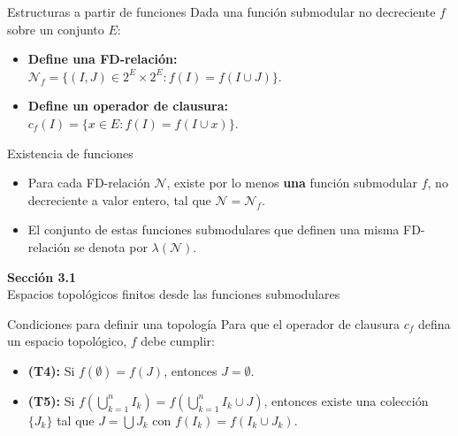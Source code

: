 \documentclass{beamer}
\begin{document}
  \begin{frame}{Estructuras a partir de funciones}
    Dada una función submodular no decreciente $f$ sobre un conjunto $E$:
    
    \vspace{0.5cm}
    \begin{itemize}[<+->]
      \item \textbf{Define una FD-relación:} \\
            $\mathcal{N}_{f}=\{(I,J)\in2^{E}\times2^{E}:f(I)=f(I\cup J)\}$.
            \vspace{0.3cm}
      \item \textbf{Define un operador de clausura:} \\
            $c_{f}(I)=\{x\in E:f(I)=f(I\cup x)\}$.
    \end{itemize}
  \end{frame}

  \begin{frame}{Existencia de funciones}
    \begin{itemize}[<+->]
      \item Para cada FD-relación $\mathcal{N}$, existe por lo menos \textbf{una} función submodular $f$, no decreciente a valor entero, tal que $\mathcal{N}=\mathcal{N}_{f}$.
      \item El conjunto de estas funciones submodulares que definen una misma FD-relación se denota por $\lambda(\mathcal{N})$.
    \end{itemize}
  \end{frame}

  \begin{frame}
    \begin{center}
      \Huge \textbf{Sección 3.1}\\
      \vspace{0.5cm}
      \Large Espacios topológicos finitos desde las funciones submodulares
    \end{center}
  \end{frame}

  \begin{frame}{Condiciones para definir una topología}
    Para que el operador de clausura $c_f$ defina un espacio topológico, $f$ debe cumplir:
    
    \vspace{0.5cm}
    \begin{itemize}[<+->]
      \item \textbf{(T4):} Si $f(\emptyset)=f(J)$, entonces $J=\emptyset$.
      \item \textbf{(T5):} Si $f(\bigcup_{k=1}^{n}I_{k})=f(\bigcup_{k=1}^{n}I_{k}\cup J)$, entonces existe una colección $\{J_{k}\}$ tal que $J=\bigcup J_{k}$ con $f(I_{k})=f(I_{k}\cup J_{k})$.
    \end{itemize}
  \end{frame}
\end{document}
